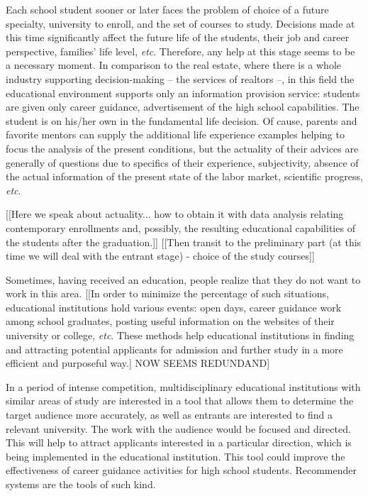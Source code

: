 \documentclass[conference]{IEEEtran}
\begin{document}
Each school student sooner or later faces the problem of choice of a future specialty, university to enroll, and the set of courses to study.  Decisions made at this time significantly affect the future life of the students, their job and career perspective, families' life level, \emph{etc}.  Therefore, any help at this stage seems to be a necessary moment. In comparison to the real estate, where there is a whole industry supporting decision-making -- the services of realtors --, in this field the educational environment supports only an information provision service: students are given only career guidance, advertisement of the high school capabilities.  The student is on his/her own in the fundamental life decision.  Of cause, parents and favorite mentors can supply the additional life experience examples helping to focus the analysis of the present conditions, but the actuality of their advices are generally of questions due to specifics of their experience, subjectivity, absence of the actual information of the present state of the labor market, scientific progress, \emph{etc}.

[[Here we speak about actuality... how to obtain it with data analysis relating contemporary enrollments and, possibly, the resulting educational capabilities of the students after the graduation.]] [[Then transit to the preliminary part (at this time we will deal with the entrant stage) - choice of the study courses]]

Sometimes, having received an education, people realize that they do not want to work in this area. [[In order to minimize the percentage of such situations, educational institutions hold various events: open days, career guidance work among school graduates, posting useful information on the websites of their university or college, \emph{etc}.  These methods help educational institutions in finding and attracting potential applicants for admission and further study in a more efficient and purposeful way.] NOW SEEMS REDUNDAND]

In a period of intense competition, multidisciplinary educational institutions with similar areas of study are interested in a tool that allows them to determine the target audience more accurately, as well as entrants are interested to find a relevant university.  The work with the audience would be focused and directed. This will help to attract applicants interested in a particular direction, which is being implemented in the educational institution.  This tool could improve the effectiveness of career guidance activities for high school students.  Recommender systems are the tools of such kind.
\end{document}
